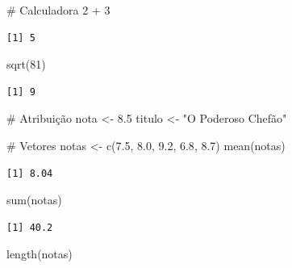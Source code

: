 \documentclass[
  letterpaper,
]{scrbook}
\newenvironment{Shaded}{\begin{snugshade}}{\end{snugshade}}
\newcommand{\CommentTok}[1]{\textcolor[rgb]{0.37,0.37,0.37}{#1}}
\newcommand{\DecValTok}[1]{\textcolor[rgb]{0.68,0.00,0.00}{#1}}
\newcommand{\FloatTok}[1]{\textcolor[rgb]{0.68,0.00,0.00}{#1}}
\newcommand{\FunctionTok}[1]{\textcolor[rgb]{0.28,0.35,0.67}{#1}}
\newcommand{\NormalTok}[1]{\textcolor[rgb]{0.00,0.23,0.31}{#1}}
\newcommand{\OtherTok}[1]{\textcolor[rgb]{0.00,0.23,0.31}{#1}}
\newcommand{\SpecialCharTok}[1]{\textcolor[rgb]{0.37,0.37,0.37}{#1}}
\newcommand{\StringTok}[1]{\textcolor[rgb]{0.13,0.47,0.30}{#1}}
\begin{document}

\begin{Shaded}
\begin{Highlighting}[]
\CommentTok{\# Calculadora}
\DecValTok{2} \SpecialCharTok{+} \DecValTok{3}
\end{Highlighting}
\end{Shaded}

\begin{verbatim}
[1] 5
\end{verbatim}

\begin{Shaded}
\begin{Highlighting}[]
\FunctionTok{sqrt}\NormalTok{(}\DecValTok{81}\NormalTok{)}
\end{Highlighting}
\end{Shaded}

\begin{verbatim}
[1] 9
\end{verbatim}

\begin{Shaded}
\begin{Highlighting}[]
\CommentTok{\# Atribuição}
\NormalTok{nota }\OtherTok{\textless{}{-}} \FloatTok{8.5}
\NormalTok{titulo }\OtherTok{\textless{}{-}} \StringTok{"O Poderoso Chefão"}

\CommentTok{\# Vetores}
\NormalTok{notas }\OtherTok{\textless{}{-}} \FunctionTok{c}\NormalTok{(}\FloatTok{7.5}\NormalTok{, }\FloatTok{8.0}\NormalTok{, }\FloatTok{9.2}\NormalTok{, }\FloatTok{6.8}\NormalTok{, }\FloatTok{8.7}\NormalTok{)}
\FunctionTok{mean}\NormalTok{(notas)}
\end{Highlighting}
\end{Shaded}

\begin{verbatim}
[1] 8.04
\end{verbatim}

\begin{Shaded}
\begin{Highlighting}[]
\FunctionTok{sum}\NormalTok{(notas)}
\end{Highlighting}
\end{Shaded}

\begin{verbatim}
[1] 40.2
\end{verbatim}

\begin{Shaded}
\begin{Highlighting}[]
\FunctionTok{length}\NormalTok{(notas)}
\end{Highlighting}
\end{Shaded}
\end{document}
